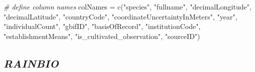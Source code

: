 \documentclass[
]{article}
\newenvironment{Shaded}{\begin{snugshade}}{\end{snugshade}}
\newcommand{\CommentTok}[1]{\textcolor[rgb]{0.56,0.35,0.01}{\textit{#1}}}
\newcommand{\FunctionTok}[1]{\textcolor[rgb]{0.00,0.00,0.00}{#1}}
\newcommand{\NormalTok}[1]{#1}
\newcommand{\OtherTok}[1]{\textcolor[rgb]{0.56,0.35,0.01}{#1}}
\newcommand{\StringTok}[1]{\textcolor[rgb]{0.31,0.60,0.02}{#1}}
\begin{document}
\begin{Shaded}
\begin{Highlighting}[]
\CommentTok{\# define column names}
\NormalTok{colNames }\OtherTok{=} \FunctionTok{c}\NormalTok{(}\StringTok{"species"}\NormalTok{,}
             \StringTok{"fullname"}\NormalTok{,}
             \StringTok{"decimalLongitude"}\NormalTok{,}
             \StringTok{"decimalLatitude"}\NormalTok{,}
             \StringTok{"countryCode"}\NormalTok{,}
             \StringTok{"coordinateUncertaintyInMeters"}\NormalTok{,}
             \StringTok{"year"}\NormalTok{,}
             \StringTok{"individualCount"}\NormalTok{,}
             \StringTok{"gbifID"}\NormalTok{,}
             \StringTok{"basisOfRecord"}\NormalTok{,}
             \StringTok{"institutionCode"}\NormalTok{,}
             \StringTok{"establishmentMeans"}\NormalTok{,}
             \StringTok{"is\_cultivated\_observation"}\NormalTok{,}
             \StringTok{"sourceID"}\NormalTok{)}
\end{Highlighting}
\end{Shaded}

\hypertarget{rainbio}{%
\subsection{\texorpdfstring{\emph{RAINBIO}}{RAINBIO}}\label{rainbio}}
\end{document}
